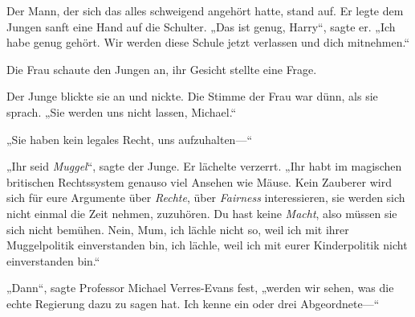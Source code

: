 Der Mann, der sich das alles schweigend angehört hatte, stand auf. Er legte dem Jungen sanft eine Hand auf die Schulter. „Das ist genug, Harry“, sagte er. „Ich habe genug gehört. Wir werden diese Schule jetzt verlassen und dich mitnehmen.“

Die Frau schaute den Jungen an, ihr Gesicht stellte eine Frage.

Der Junge blickte sie an und nickte. Die Stimme der Frau war dünn, als sie sprach. „Sie werden uns nicht lassen, Michael.“

„Sie haben kein legales Recht, uns aufzuhalten—“

„Ihr seid \emph{Muggel}“, sagte der Junge. Er lächelte verzerrt. „Ihr habt im magischen britischen Rechtssystem genauso viel Ansehen wie Mäuse. Kein Zauberer wird sich für eure Argumente über \emph{Rechte}, über \emph{Fairness} interessieren, sie werden sich nicht einmal die Zeit nehmen, zuzuhören. Du hast keine \emph{Macht}, also müssen sie sich nicht bemühen. Nein, Mum, ich lächle nicht so, weil ich mit ihrer Muggelpolitik einverstanden bin, ich lächle, weil ich mit eurer Kinderpolitik nicht einverstanden bin.“

„Dann“, sagte Professor Michael Verres-Evans fest, „werden wir sehen, was die echte Regierung dazu zu sagen hat. Ich kenne ein oder drei Abgeordnete—“

